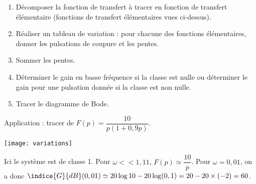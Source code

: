 \begin{methode}
\begin{enumerate}
\item Décomposer la fonction de transfert à tracer en fonction de transfert élémentaire (fonctions de transfert élémentaires vues ci-dessus).
\item Réaliser un tableau de variation : pour chacune des fonctions élémentaires, donner les pulsations de coupure et les pentes.
\item Sommer les pentes.
\item Déterminer le gain en basse fréquence si la classe est nulle ou déterminer le gain pour une pulsation donnée si la classe est non nulle.
\item Tracer le diagramme de Bode.
\end{enumerate}
\end{methode}

Application : tracer de $F(p)=\dfrac{10}{p\left(1+0,9p\right)}$.

\begin{center}
\texttt{[image: variations]}
\end{center}

Ici le système est de classe 1. Pour $\omega << 1,11$, $F(p)\simeq \dfrac{10}{p}$. Pour $\omega = 0,01$, on a donc $\indice{G}{dB}(0,01) \simeq 20\log 10 - 20\log (0,1) = 20-20\times (-2) = 60$.

\begin{figure}[!h]
\centering
{}
\end{figure}
